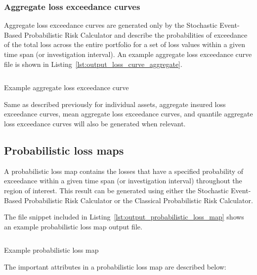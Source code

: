 \subsubsection{Aggregate loss exceedance curves}
\label{subsubsec:aggregate_loss_curves}

Aggregate loss exceedance curves are generated only by the Stochastic Event-
Based Probabilistic Risk Calculator and describe the probabilities of
exceedance of the total loss across the entire portfolio for a set of
loss values within a given time span (or investigation interval). An example aggregate loss exceedance curve file is shown in Listing~\ref{lst:output_loss_curve_aggregate}.

\begin{listing}[htbp]
  \inputminted[firstline=1,firstnumber=1,fontsize=\footnotesize,frame=single,bgcolor=lightgray]{xml}{oqum/risk/verbatim/output_loss_curve_aggregate.xml}
  \caption{Example aggregate loss exceedance curve}
  \label{lst:output_loss_curve_aggregate}
\end{listing}

Same as described previously for individual assets, aggregate insured loss
exceedance curves, mean aggregate loss exceedance curves, and quantile
aggregate loss exceedance curves will also be generated when relevant.


\subsection{Probabilistic loss maps}
\label{subsec:probabilistic_loss_map}

A probabilistic loss map contains the losses that have a specified probability
of exceedance within a given time span (or investigation interval) throughout
the region of interest. This result can be generated using either the
Stochastic Event-Based Probabilistic Risk Calculator or the Classical
Probabilistic Risk Calculator.

The file snippet included in Listing~\ref{lst:output_probabilistic_loss_map}
shows an example probabilistic loss map output file.

\begin{listing}[htbp]
  \inputminted[firstline=1,firstnumber=1,fontsize=\footnotesize,frame=single,bgcolor=lightgray]{xml}{oqum/risk/verbatim/output_probabilistic_loss_map.xml}
  \caption{Example probabilistic loss map}
  \label{lst:output_probabilistic_loss_map}
\end{listing}

The important attributes in a probabilistic loss map are described below:

